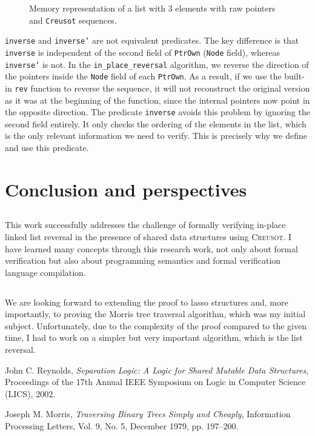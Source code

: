 \documentclass[11pt,a4paper]{article}
\begin{document}
\begin{itemize}
\begin{figure}[h]
    
    \caption{Memory representation of a list with 3 elements with raw pointers and \texttt{Creusot} sequences.}
  \end{figure}
\newpage  
    \texttt{inverse} and \texttt{inverse'} are not equivalent predicates. The key difference is that \texttt{inverse} is independent of the second field of \texttt{PtrOwn} (\texttt{Node} field), whereas \texttt{inverse'} is not. In the \texttt{in\_place\_reversal} algorithm, we reverse the direction of the pointers inside the \texttt{Node} field of each \texttt{PtrOwn}. As a result, if we use the built-in \texttt{rev} function to reverse the sequence, it will not reconstruct the original version as it was at the beginning of the function, since the internal pointers now point in the opposite direction.  
    The predicate \texttt{inverse} avoids this problem by ignoring the second field entirely. It only checks the ordering of the elements in the list, which is the only relevant information we need to verify. This is precisely why we define and use this predicate.
  \end{itemize}

\section{Conclusion and perspectives}
\subsection{}
This work successfully addresses the challenge of formally verifying in-place linked list reversal in the presence of shared data structures using \textsc{Creusot}. I have learned many concepts through this research work, not only about formal verification but also about programming semantics and formal verification language compilation.

\subsection{}
We are looking forward to extending the proof to lasso structures and, more importantly, to proving the Morris tree traversal algorithm, which was my initial subject. Unfortunately, due to the complexity of the proof compared to the given time, I had to work on a simpler but very important algorithm, which is the list reversal.
\newpage

\begin{thebibliography}{9}

John C. Reynolds,  
\textit{Separation Logic: A Logic for Shared Mutable Data Structures},  
Proceedings of the 17th Annual IEEE Symposium on Logic in Computer Science (LICS), 2002.

Joseph M. Morris,  
\textit{Traversing Binary Trees Simply and Cheaply},  
Information Processing Letters, Vol. 9, No. 5, December 1979, pp. 197–200.
\end{thebibliography}
\newpage

\end{document}
